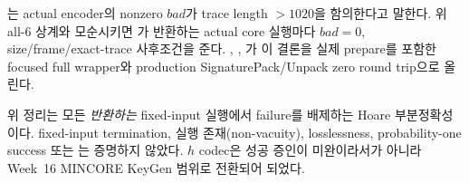 \begin{verified}
는 actual encoder의 nonzero
\(bad\)가 trace length \(>1020\)을 함의한다고 말한다. 위 all-6 상계와
모순시키면 가 반환하는 actual
core 실행마다 \(bad=0\), size/frame/exact-trace 사후조건을 준다.
,
,
가 이 결론을 실제
prepare를 포함한 focused full wrapper와 production SignaturePack/Unpack zero
round trip으로 올린다.
\end{verified}

\begin{caution}
위 정리는 모든 \emph{반환하는} fixed-input 실행에서 failure를 배제하는 Hoare
부분정확성이다. fixed-input termination, 실행 존재(non-vacuity), losslessness,
probability-one success 또는 는 증명하지 않았다. \(h\)
codec은 성공 증인이 미완이라서가 아니라 Week~16 MINCORE KeyGen 범위로 전환되어
\statusdeferred 되었다.
\end{caution}


